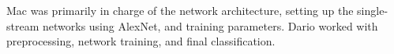 
Mac was primarily in charge of the network architecture, setting up the single-stream networks using AlexNet, and training parameters. Dario worked with preprocessing, network training, and final classification.
